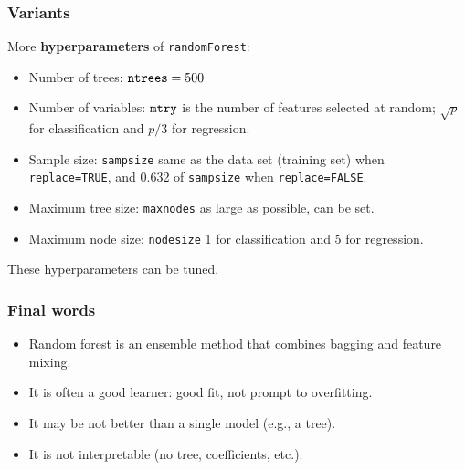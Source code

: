 \begin{frame}
\frametitle{Variants}
More {\bf hyperparameters} of {\tt randomForest}:
\begin{itemize}
\item Number of trees: ${\tt ntrees} = 500$
\item Number of variables: ${\tt mtry}$ is the number of features selected at random; $\sqrt{p}$ for classification and $p/3$ for regression.
\item Sample size: {\tt sampsize} same as the data set (training set) when {\tt replace=TRUE}, and 0.632 of {\tt sampsize} when {\tt replace=FALSE}.
\item Maximum tree size: {\tt maxnodes} as large as possible, can be set.
\item Maximum node size: {\tt nodesize} 1 for classification and 5 for regression.
\end{itemize}
These hyperparameters can be tuned.
\end{frame}
\begin{frame}
\frametitle{Final words}
\begin{itemize}
\item Random forest is an ensemble method that combines bagging and feature mixing.
\item It is often a good learner: good fit, not prompt to overfitting.
\item It may be not better than a single model (e.g., a tree).
\item It is not interpretable (no tree, coefficients, etc.).
\end{itemize}
\end{frame}
